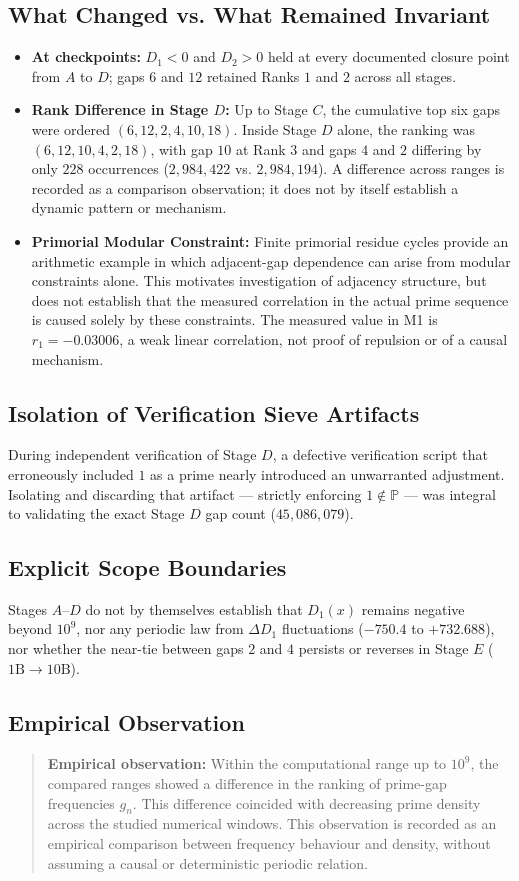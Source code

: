 \documentclass[12pt,a4paper]{article}
\begin{document}
\subsection{What Changed vs. What Remained Invariant}
\begin{itemize}
\item \textbf{At checkpoints:} $D_1 < 0$ and $D_2 > 0$ held at every documented closure point from $A$ to $D$; gaps $6$ and $12$ retained Ranks $1$ and $2$ across all stages.
\item \textbf{Rank Difference in Stage $D$:} Up to Stage $C$, the cumulative top six gaps were ordered $(6, 12, 2, 4, 10, 18)$. Inside Stage $D$ alone, the ranking was $(6, 12, 10, 4, 2, 18)$, with gap $10$ at Rank $3$ and gaps $4$ and $2$ differing by only $228$ occurrences ($2{,}984{,}422$ vs. $2{,}984{,}194$). A difference across ranges is recorded as a comparison observation; it does not by itself establish a dynamic pattern or mechanism.
\item \textbf{Primorial Modular Constraint:} Finite primorial residue cycles provide an arithmetic example in which adjacent-gap dependence can arise from modular constraints alone. This motivates investigation of adjacency structure, but does not establish that the measured correlation in the actual prime sequence is caused solely by these constraints. The measured value in M1 is $r_1 = -0.03006$, a weak linear correlation, not proof of repulsion or of a causal mechanism.
\end{itemize}
\subsection{Isolation of Verification Sieve Artifacts}
During independent verification of Stage $D$, a defective verification script that erroneously included $1$ as a prime nearly introduced an unwarranted adjustment. Isolating and discarding that artifact — strictly enforcing $1 \notin \mathbb{P}$ — was integral to validating the exact Stage $D$ gap count ($45{,}086{,}079$).
\subsection{Explicit Scope Boundaries}
Stages $A$--$D$ do not by themselves establish that $D_1(x)$ remains negative beyond $10^9$, nor any periodic law from $\Delta D_1$ fluctuations ($-750.4$ to $+732.688$), nor whether the near-tie between gaps $2$ and $4$ persists or reverses in Stage $E$ ($1\text{B} \rightarrow 10\text{B}$).
\subsection{Empirical Observation}
\begin{quote}
\textbf{Empirical observation:} Within the computational range up to $10^9$, the compared ranges showed a difference in the ranking of prime-gap frequencies $g_n$. This difference coincided with decreasing prime density across the studied numerical windows. This observation is recorded as an empirical comparison between frequency behaviour and density, without assuming a causal or deterministic periodic relation.
\end{quote}
\end{document}
